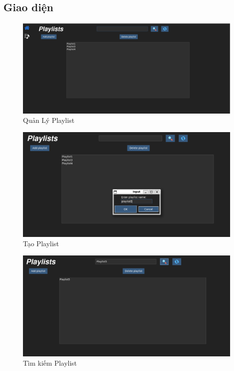 \documentclass[a4paper]{article}
\begin{document}
\subsection{Giao diện}
\begin{figure}[H]
    \centering
    \includegraphics[width=1.0\textwidth]{quanlyplaylist.PNG}
    \caption{Quản Lý Playlist}
    \label{fig:example_image}
\end{figure}

\begin{figure}[H]
    \centering
    \includegraphics[width=1.0\textwidth]{addplaylist.PNG}
    \caption{Tạo Playlist}
    \label{fig:example_image}
\end{figure}

\begin{figure}[H]
    \centering
    \includegraphics[width=1.0\textwidth]{searchplaylist.PNG}
    \caption{Tìm kiếm Playlist}
    \label{fig:example_image}
\end{figure}
\end{document}
